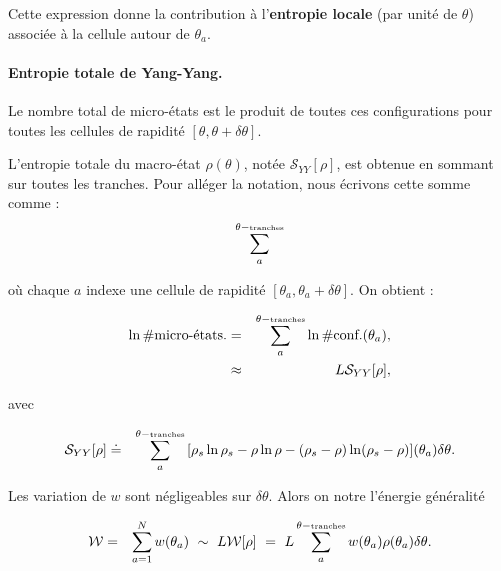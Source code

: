Cette expression donne la contribution à l’{\bf entropie locale} (par unité de $\theta$) associée à la cellule autour de $\theta_a$.

\paragraph{Entropie totale de Yang-Yang.}
Le nombre total de micro-états est le produit de toutes ces configurations pour toutes les cellules de rapidité $[\theta, \theta + \delta \theta]$. %

L'entropie totale du macro-état $\rho(\theta)$, notée $\mathcal{S}_{YY}[\rho]$, est obtenue en sommant sur toutes les tranches. Pour alléger la notation, nous écrivons cette somme comme :
\begin{eqnarray}
	\sum_a^{\theta-\mbox{\tiny tranches}}	
\end{eqnarray}

où chaque $a$ indexe une cellule de rapidité $[\theta_a, \theta_a + \delta\theta]$.
On obtient :

\begin{eqnarray}
    \ln \# \mbox{micro-états.} & = & \sum_a^{\theta-\mbox{\tiny tranches}} \ln \# \mbox{conf.}(\theta_a), \\
    & \approx &   L\mathcal{S}_{YY} [ \rho ] , 	
\end{eqnarray}

avec 

\begin{eqnarray}
    \mathcal{S}_{YY}[\rho] & \doteq & \sum_a^{\theta-\mbox{\tiny tranches}} \, [ \rho_s\ln \rho_s - \rho \ln \rho - ( \rho_s - \rho ) \ln ( \rho_s - \rho ) ] (\theta_a) \delta \theta .
\end{eqnarray}
	
Les variation de $w$ sont négligeables sur $\delta \theta $. Alors on notre l'énergie généralité%

\begin{eqnarray}
	 \mathcal{W} & = & \sum_{a = 1}^N  w(\theta_a)	 ~ \sim ~ L\mathcal{W}[\rho] ~=~ L \sum_a^{\theta-\mbox{\tiny tranches}}	 w(\theta_a) \rho(\theta_a) \delta \theta.
\end{eqnarray}

